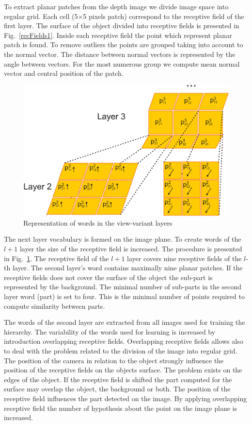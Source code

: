 \documentclass[letterpaper,10pt,conference]{ieeeconf}  %
\begin{document}
To extract planar patches from the depth image we divide image space into regular grid. Each cell (5$\times$5 pixels patch) correspond to the receptive field of the first layer. The surface of the object divided into receptive fields is presented in Fig.~\ref{recFields1}. Inside each receptive field the point which represent planar patch is found. To remove outliers the points are grouped taking into account to the normal vector. The distance between normal vectors is represented by the angle between vectors. For the most numerous group we compute mean normal vector and central position of the patch.

\begin{figure}[t]
 \centering
\includegraphics[width=0.9\columnwidth]{../images/word.eps}
\caption{Representation of words in the view-variant layers}
 \label{word}
\end{figure}

The next layer vocabulary is formed on the image plane. To create words of the $l+1$ layer the size of the receptive field is increased. The procedure is presented in Fig.~\ref{word}. The receptive field of the $l+1$ layer covers nine receptive fields of the $l$-th layer. The second layer's word contains maximally nine planar patches. If the receptive fields does not cover the surface of the object the sub-part is represented by the background. The minimal number of sub-parts in the second layer word (part) is set to four. This is the minimal number of points required to compute similarity between parts.

The words of the second layer are extracted from all images used for training the hierarchy. The variability of the words used for learning is increased by introduction overlapping receptive fields. Overlapping receptive fields allows also to deal with the problem related to the division of the image into regular grid. The position of the camera in relation to the object strongly influence the position of the receptive fields on the objects surface. The problem exists on the edges of the object. If the receptive field is shifted the part computed for the surface may overlap the object, the background or both. The position of the receptive field influences the part detected on the image. By applying overlapping receptive field the number of hypothesis about the point on the image plane is increased.
\end{document}
